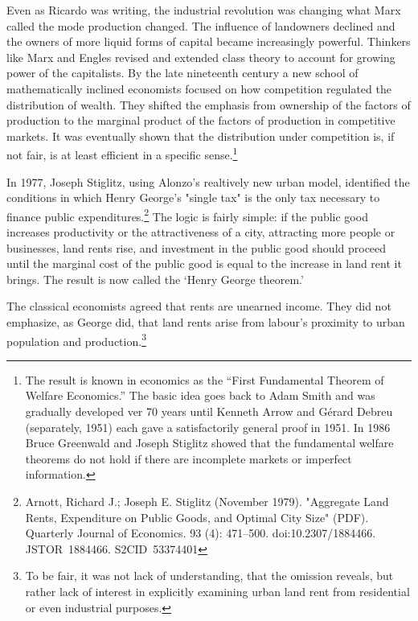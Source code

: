   
Even as Ricardo was writing, the industrial revolution was changing what Marx called the mode production changed. The influence of landowners declined and the owners of more liquid forms of capital became increasingly powerful. Thinkers like Marx and Engles revised and extended  class theory to account for growing power of the capitalists.  By the late nineteenth  century a new school of mathematically inclined economists focused on how competition regulated the distribution of wealth. They shifted the emphasis from ownership of the factors of production to the marginal product of the factors of production in competitive markets. It was eventually shown that the distribution under competition is, if not fair,  is at least efficient in a specific sense.\footnote{The result is known  in economics as the ``First Fundamental Theorem of Welfare Economics.'' The basic idea goes back to Adam Smith and was gradually developed  ver 70 years until Kenneth Arrow and Gérard Debreu (separately, 1951) each gave  a satisfactorily general proof in 1951. In 1986 %
Bruce Greenwald and Joseph Stiglitz showed that the fundamental welfare theorems do not hold if there are incomplete markets or imperfect information.}

  
  In 1977, Joseph Stiglitz, using Alonzo's realtively new urban model, identified the conditions in which Henry George's "single tax" is  the only tax necessary to finance public expenditures.\footnote{Arnott, Richard J.; Joseph E. Stiglitz (November 1979). "Aggregate Land Rents, Expenditure on Public Goods, and Optimal City Size" (PDF). Quarterly Journal of Economics. 93 (4): 471–500. doi:10.2307/1884466. JSTOR 1884466. S2CID 53374401 }   The logic is fairly simple: if the public good increases productivity or the attractiveness of a city, attracting more people or businesses, land rents rise, and investment in the public good should proceed until the marginal cost of the public good is equal to the increase in land rent it brings. The result is now called the `Henry George theorem.'



The classical economists agreed that rents are unearned income. They did not emphasize, as George did, that land rents arise from labour's proximity to urban population and production.\footnote{To be fair, it was not lack of understanding, that the omission reveals, but rather lack of interest in explicitly examining urban land rent from residential or even industrial purposes.}%

